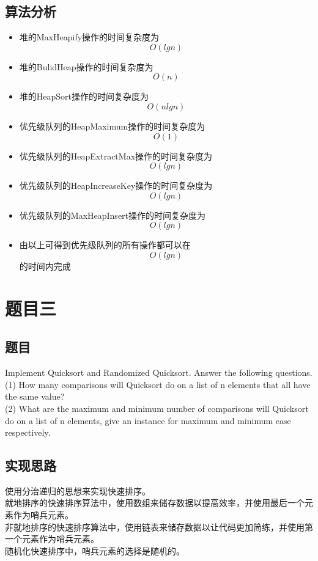 \documentclass[a4paper]{article}
\begin{document}
\subsection{算法分析}

\begin{itemize}
\item
  堆的MaxHeapify操作的时间复杂度为 \[ O(lg n)\]
\item
  堆的BulidHeap操作的时间复杂度为 \[ O(n) \]
\item
  堆的HeapSort操作的时间复杂度为 \[ O(n lg n) \]
\item
  优先级队列的HeapMaximum操作的时间复杂度为 \[ O(1)\]
\item
  优先级队列的HeapExtractMax操作的时间复杂度为 \[ O(lg n)\]
\item
  优先级队列的HeapIncreaseKey操作的时间复杂度为 \[ O(lg n)\]
\item
  优先级队列的MaxHeapInsert操作的时间复杂度为 \[ O(lg n)\]
\item
  由以上可得到优先级队列的所有操作都可以在 \[ O(lg n)\] 的时间内完成
\end{itemize}

\section{题目三}

\subsection{题目}

Implement Quicksort and Randomized Quicksort. Answer the following questions.\\
(1) How many comparisons will Quicksort do on a list of n elements that all have the same value? \\
(2) What are the maximum and minimum number of comparisons will Quicksort do on a list of n elements, give an instance for maximum and minimum case respectively. 

\subsection{实现思路}

使用分治递归的思想来实现快速排序。\\
就地排序的快速排序算法中，使用数组来储存数据以提高效率，并使用最后一个元素作为哨兵元素。\\
非就地排序的快速排序算法中，使用链表来储存数据以让代码更加简练，并使用第一个元素作为哨兵元素。\\
随机化快速排序中，哨兵元素的选择是随机的。\\
\end{document}
